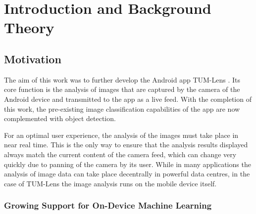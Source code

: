 \documentclass[
			   fontsize=11pt,
               paper=a4,
               bibliography=totoc,
               idxtotoc,
               headsepline,
               footsepline,
               footinclude=false,
               BCOR=12mm,
               DIV=13,
               openany,   %
               ]
               {scrbook}
\begin{document}
\tableofcontents
\thispagestyle{empty}
\cleardoubleemptypage


\mainmatter

\part{Introduction and Background Theory}

\chapter{Motivation} \label{chap:motivation}

The aim of this work was to further develop the Android app TUM-Lens \cite{lensApp}. Its core function is the analysis of images that are captured by the camera of the Android device and transmitted to the app as a live feed. With the completion of this work, the pre-existing image classification capabilities of the app are now complemented with object detection.

For an optimal user experience, the analysis of the images must take place in near real time. This is the only way to ensure that the analysis results displayed always match the current content of the camera feed, which can change very quickly due to panning of the camera by its user. While in many applications the analysis of image data can take place decentrally in powerful data centres, in the case of TUM-Lens the image analysis runs on the mobile device itself.


\section{Growing Support for On-Device Machine Learning}
\end{document}

